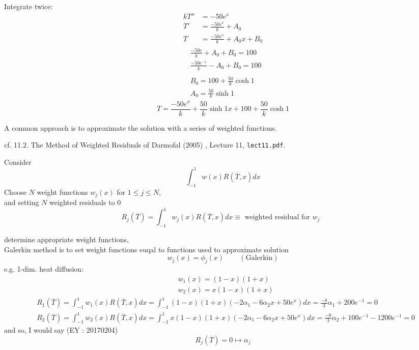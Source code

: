 \documentclass[10pt]{amsart}
\begin{document}
\begin{multicols*}{2}
Integrate twice:
\[
\begin{aligned}
  kT'' & = -50 e^x \\ 
T' & = \frac{-50 e^x}{k} + A_0 \\ 
 T & = \frac{ -50 e^x}{k} + A_0x + B_0
\end{aligned}
\]
\[
\begin{gathered}
\begin{aligned}
  & \frac{-50 e}{k} + A_0 + B_0 = 100 \\ 
  & \frac{-50 e^{-1}}{k} - A_0 + B_0 = 100 
  \end{aligned} \\ 
\begin{aligned}
  & B_0 = 100 + \frac{50}{k} \cosh{1} \\ 
  & A_0 = \frac{50}{k} \sinh{1}
  \end{aligned}
\end{gathered}
\]
\[
T= \frac{-50 e^x }{k} + \frac{50}{k} \sinh{1} x + 100 + \frac{50}{k} \cosh{1}
\]

A common approach is to approximate the solution with a series of weighted functions.




cf. 11.2. The Method of Weighted Residuals of Darmofal (2005) \cite{Darm2005}, Lecture 11, \verb|lect11.pdf|.

Consider
\[
\int_{-1}^1 w(x) R(\overline{T},x)dx
\]
Choose $N$ weight functions $w_j(x)$ for $1\leq j \leq N$, \\
and setting $N$ weighted residuals to $0$
\begin{equation}
R_j(\overline{T}) = \int_{-1}^1 w_j(x) R(\overline{T},x)dx \equiv \text{ weighted residual for $w_j$ }
  \end{equation}

determine appropriate weight functions, \\
Galerkin method is to set weight functions euqal to functions used to approximate solution
\[
w_j(x) = \phi_j(x) \qquad \, (\text{Galerkin})
\]
e.g. 1-dim. heat diffusion:
\[
\begin{aligned}
  & w_1(x) = (1-x)(1+x) \\ 
  & w_2(x) = x(1-x)(1+x)
\end{aligned}
\]
\[
\begin{aligned}
  & R_1(\overline{T}) = \int_{-1}^1 w_1(x)R(\overline{T},x) dx = \int_{-1}^1 (1-x)(1+x)(-2\alpha_1 - 6\alpha_2x + 50e^x)dx= \frac{-8}{3}\alpha_1 + 200e^{-1} = 0 \\
  & R_2(\overline{T}) = \int_{-1}^1 w_2(x)R(\overline{T},x) dx = \int_{-1}^1 x(1-x)(1+x)(-2\alpha_1 - 6\alpha_2x + 50e^x)dx= \frac{-8}{3}\alpha_2 + 100e^{-1} -1200 e^{-1}= 0 
\end{aligned}
\]
and so, I would say (EY : 20170204)
\begin{equation}
  R_j(\overline{T}) =0 \mapsto \alpha_j
  \end{equation}



\end{multicols*}
\end{document}
